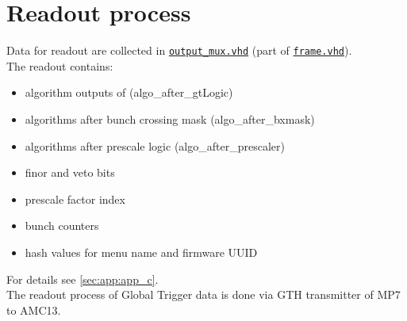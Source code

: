 \section{Readout process}\label{sec:rop:rop}

Data for readout are collected in \href{\gitbranch/firmware/hdl/payload/frame/output_mux.vhd}{\texttt{\textquotesingle output\_mux.vhd\textquotesingle }} (part of \href{\gitbranch/firmware/hdl/payload/frame.vhd}{\texttt{\textquotesingle frame.vhd\textquotesingle }}).\\
The readout contains:
\begin{itemize}
\item algorithm outputs of \ugtl (algo\_after\_gtLogic)
\item algorithms after bunch crossing mask (algo\_after\_bxmask)
\item algorithms after prescale logic (algo\_after\_prescaler)
\item finor and veto bits
\item prescale factor index
\item bunch counters
\item hash values for menu name and firmware UUID
\end{itemize}
For details see \ref{sec:app:app_c}.\\
The readout process of Global Trigger data is done via GTH transmitter of MP7 to AMC13.

\clearpage
